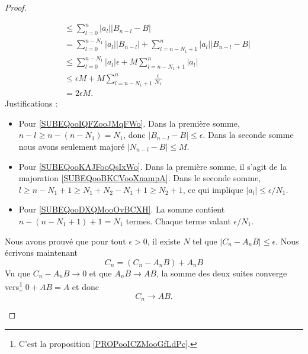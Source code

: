 \begin{proof}
\begin{subproof}
\begin{subequations}
\begin{align}
				             & \leq \sum_{l=0}^n| a_l | |B_{n-l}-B |                                                              \\
				             & =\sum_{l=0}^{n-N_1}| a_l | |B_{n-l} |+\sum_{l=n-N_1+1}^n| a_l | |B_{n-l}-B |                       \\
				             & \leq \sum_{l=0}^{n-N_1}| a_l |\epsilon+M\sum_{l=n-N_1+1}^n| a_l |      \label{SUBEQooIQFZooJMqFWo} \\
				             & \leq \epsilon M +M\sum_{l=n-N_1+1}^n\frac{ \epsilon }{ N_1 }      \label{SUBEQooKAJFooQsIxWo}      \\
				             & =2\epsilon M.   \label{SUBEQooDXQMooOvBCXH}
			\end{align}
		\end{subequations}
		Justifications :
		\begin{itemize}
			\item Pour \eqref{SUBEQooIQFZooJMqFWo}. Dans la première somme, \( n-l\geq n-(n-N_1)=N_1\), donc \( | B_{n-l}-B |\leq \epsilon\). Dans la seconde somme nous avons seulement majoré \( | N_{n-l}-B |\leq M\).
			\item Pour \eqref{SUBEQooKAJFooQsIxWo}. Dans la première somme, il s'agit de la majoration \eqref{SUBEQooBKCVooXnampA}. Dans le seconde somme, \( l\geq n-N_1+1\geq N_1+N_2-N_1+1\geq N_2+1\), ce qui implique \( | a_l |\leq \epsilon/N_1\).
			\item Pour \eqref{SUBEQooDXQMooOvBCXH}. La somme contient \( n-(n-N_1+1)+1=N_1\) termes. Chaque terme valant \( \epsilon/N_1\).
		\end{itemize}
		\spitem[Conclusion]
		Nous avons prouvé que pour tout \( \epsilon>0\), il existe \( N\) tel que \( | C_n-A_nB |\leq \epsilon\). Nous écrivons maintenant
		\begin{equation}
			C_n=(C_n-A_nB)+A_nB
		\end{equation}
		Vu que \( C_n-A_nB\to 0\) et que \( A_nB\to AB\), la somme des deux suites converge vers\footnote{C'est la proposition \ref{PROPooICZMooGfLdPc}.} \( 0+AB=A\) et donc
		\begin{equation}
			C_n\to AB.
		\end{equation}
	\end{subproof}
\end{proof}


